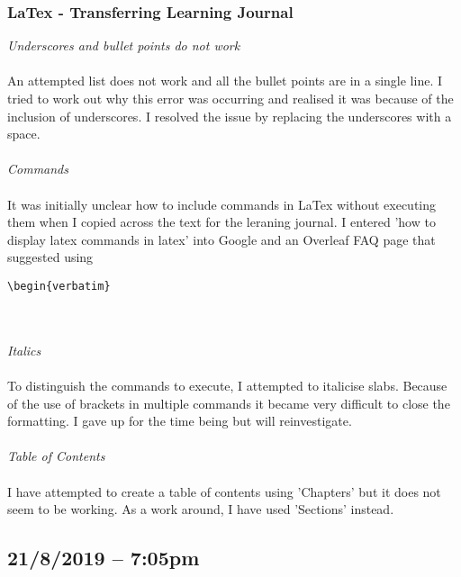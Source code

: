 \documentclass{article}
\begin{document}
\subsubsection*{LaTex - Transferring Learning Journal}
\textit{Underscores and bullet points do not work}\label{error:Underscore}\\\\
An attempted list does not work and all the bullet points are in a single line. I tried to work out why this error was occurring and realised it was because of the inclusion of underscores. I resolved the issue by replacing the underscores with a space.\\\\
\textit{Commands}\\\\\label{error:Commands in LaTex}
It was initially unclear how to include commands in LaTex without executing them when I copied across the text for the leraning journal. I entered 'how to display latex commands in latex' into Google and an Overleaf FAQ page that suggested using  \begin{verbatim}\begin{verbatim} \end{verbatim} \\\\
\textit{Italics}\\\\
To distinguish the commands to execute, I attempted to italicise slabs. Because of the use of brackets in multiple commands it became very difficult to close the formatting. I gave up for the time being but will reinvestigate.\\\\
\textit{Table of Contents}\\\\
I have attempted to create a table of contents using 'Chapters' but it does not seem to be working. As a work around, I have used 'Sections' instead.

\subsection*{21/8/2019 – 7:05pm}
\end{document}
